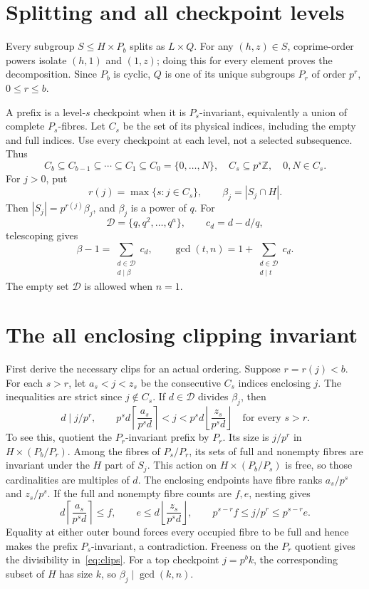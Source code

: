 \documentclass[11pt,letterpaper]{article}
\theoremstyle{definition}\newtheorem{definition}{Definition}
\newcommand{\D}{\mathcal D}
\begin{document}
\section{Splitting and all checkpoint levels}\label{sec:checkpoints}
Every subgroup $S\le H\times P_b$ splits as $L\times Q$. For any $(h,z)\in S$, coprime-order powers isolate $(h,1)$ and $(1,z)$; doing this for every element proves the decomposition. Since $P_b$ is cyclic, $Q$ is one of its unique subgroups $P_r$ of order $p^r$, $0\le r\le b$.

A prefix is a level-$s$ checkpoint when it is $P_s$-invariant, equivalently a union of complete $P_s$-fibres. Let $C_s$ be the set of its physical indices, including the empty and full indices. Use every checkpoint at each level, not a selected subsequence. Thus
\begin{equation}
C_b\subseteq C_{b-1}\subseteq\cdots\subseteq C_1\subseteq C_0=\{0,\ldots,N\},
\quad C_s\subseteq p^s\mathbb Z,\quad 0,N\in C_s.\label{eq:hierarchy}
\end{equation}
For $j>0$, put
\[
r(j)=\max\{s:j\in C_s\},\qquad \beta_j=|S_j\cap H|.
\]
Then $|S_j|=p^{r(j)}\beta_j$, and $\beta_j$ is a power of $q$. For
\[
\D=\{q,q^2,\ldots,q^a\},\qquad c_d=d-d/q,
\]
telescoping gives
\begin{equation}
\beta-1=\sum_{\substack{d\in\D\\d\mid\beta}}c_d,
\qquad \gcd(t,n)=1+\sum_{\substack{d\in\D\\d\mid t}}c_d.\label{eq:weights}
\end{equation}
The empty set $\D$ is allowed when $n=1$.

\section{The all enclosing clipping invariant}\label{sec:clips}
First derive the necessary clips for an actual ordering. Suppose $r=r(j)<b$. For each $s>r$, let $a_s<j<z_s$ be the consecutive $C_s$ indices enclosing $j$. The inequalities are strict since $j\notin C_s$. If $d\in\D$ divides $\beta_j$, then
\begin{equation}
d\mid j/p^r,\qquad
p^sd\left\lceil\frac{a_s}{p^sd}\right\rceil<j
 <p^sd\left\lfloor\frac{z_s}{p^sd}\right\rfloor
\quad\text{for every }s>r.\label{eq:clips}
\end{equation}
To see this, quotient the $P_r$-invariant prefix by $P_r$. Its size is $j/p^r$ in $H\times(P_b/P_r)$. Among the fibres of $P_s/P_r$, its sets of full and nonempty fibres are invariant under the $H$ part of $S_j$. This action on $H\times(P_b/P_s)$ is free, so those cardinalities are multiples of $d$. The enclosing endpoints have fibre ranks $a_s/p^s$ and $z_s/p^s$. If the full and nonempty fibre counts are $f,e$, nesting gives
\[
d\left\lceil\frac{a_s}{p^sd}\right\rceil\le f,
\qquad e\le d\left\lfloor\frac{z_s}{p^sd}\right\rfloor,
\qquad p^{s-r}f\le j/p^r\le p^{s-r}e.
\]
Equality at either outer bound forces every occupied fibre to be full and hence makes the prefix $P_s$-invariant, a contradiction. Freeness on the $P_r$ quotient gives the divisibility in~\eqref{eq:clips}. For a top checkpoint $j=p^bk$, the corresponding subset of $H$ has size $k$, so $\beta_j\mid\gcd(k,n)$.
\end{document}
